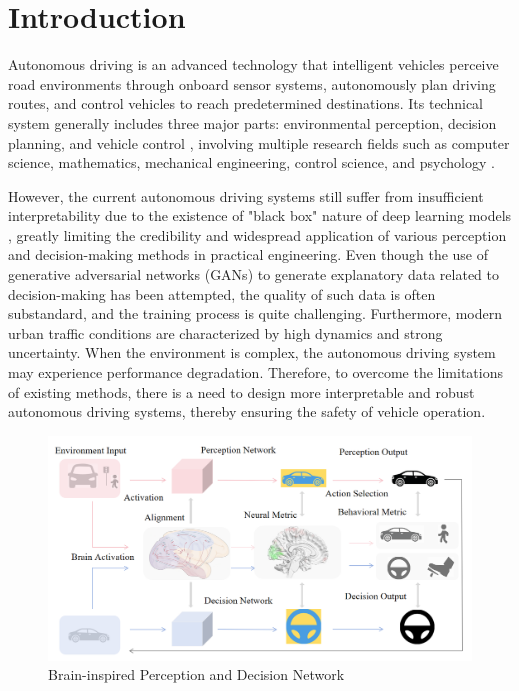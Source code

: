 \section{Introduction}
\label{sec:intro}
\hspace{1pc}Autonomous driving \cite{urmson2008autonomous} is an advanced technology that intelligent vehicles perceive road environments through onboard sensor systems, autonomously plan driving routes, and control vehicles to reach predetermined destinations. Its technical system generally includes three major parts: environmental perception, decision planning, and vehicle control \cite{amini2020learning, montemerlo2008junior}, involving multiple research fields such as computer science, mathematics, mechanical engineering, control science, and psychology \cite{chen2015deepdriving}.

However, the current autonomous driving systems still suffer from insufficient interpretability due to the existence of "black box" nature of deep learning models \cite{7979332}, greatly limiting the credibility and widespread application of various perception and decision-making methods in practical engineering. Even though the use of generative adversarial networks (GANs) \cite{zugner2020adversarial} to generate explanatory data related to decision-making has been attempted, the quality of such data is often substandard, and the training process is quite challenging. Furthermore, modern urban traffic conditions are characterized by high dynamics and strong uncertainty. When the environment is complex, the autonomous driving system may experience performance degradation. Therefore, to overcome the limitations of existing methods, there is a need to design more interpretable and robust autonomous driving systems, thereby ensuring the safety of vehicle operation.
\begin{figure}[t]
	\centering
	\includegraphics[width=0.8\linewidth]{brain_inspired.png}
	
	\caption{Brain-inspired Perception and Decision Network}
	\label{fig:fig1}
\end{figure}

